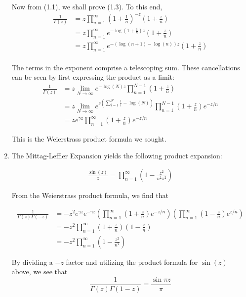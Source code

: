 \documentclass[12pt]{article}%
\begin{document}
\begin{enumerate}
  Now from (1.1), we shall prove (1.3). To this end,
  \begin{align*}
    \frac{1}{\Gamma(z)} & = z \prod_{n=1}^\infty \left(1 + \frac{1}{n}\right)^{-z}\left(1 + \frac{z}{n}\right) \\
    & = z  \prod_{n=1}^\infty e^{-\log(1 + \frac{1}{n})z} \left(1 + \frac{z}{n}\right) \\
    & = z  \prod_{n=1}^\infty e^{-(\log(n+1) - \log(n))z}\left(1 + \frac{z}{n}\right) \\
  \end{align*}

  The terms in the exponent comprise a telescoping sum. These cancellations can be seen by first expressing the product as a limit:
  \begin{align*}
     \frac{1}{\Gamma(z)} & = z \lim_{N \rightarrow \infty}  e^{-\log(N)z} \prod_{n=1}^{N-1} \left(1 + \frac{z}{n}\right) \\
     & = z \lim_{N \rightarrow \infty} e^{z\left(\sum_{i=1}^N \frac{1}{i} - \log(N)\right)}  \prod_{n=1}^{N-1} \left(1 + \frac{z}{n}\right)e^{-z/n} \\
     & = z e^{\gamma z}\prod_{n=1}^\infty \left(1 + \frac{z}{n}\right)e^{-z/n}
  \end{align*}

  This is the Weierstrass product formula we sought.

  \item
  The Mittag-Leffler Expansion yields the following product expansion:

  \begin{align*}
    \frac{\sin(z)}{z} = \prod_{n=1}^\infty \left(1 - \frac{z^2}{n^2\pi^2}\right)
  \end{align*}

  From the Weierstrass product formula, we find that

  \begin{align*}
    \frac{1}{\Gamma(z)\Gamma(-z)} & = -z^2e^{\gamma z} e^{-\gamma z}\left(\prod_{n=1}^\infty \left(1 + \frac{z}{n}\right)e^{-z/n}\right)\left(\prod_{n=1}^\infty \left(1 - \frac{z}{n}\right)e^{z/n}\right) \\
    & = -z^2 \prod_{n=1}^\infty \left(1 + \frac{z}{n}\right)\left(1 - \frac{z}{n}\right) \\
    & = -z^2 \prod_{n=1}^\infty \left(1 - \frac{z^2}{n^2}\right)
  \end{align*}

  By dividing a $-z$ factor and utilizing the product formula for $\sin(z)$ above, we see that
  \[ \frac{1}{\Gamma(z)\Gamma(1-z)} = \frac{\sin{\pi z}}{\pi}\]


\end{enumerate}
\end{document}

